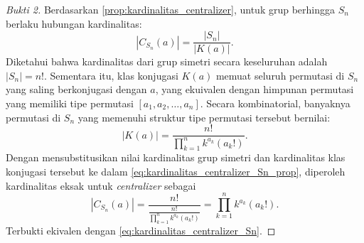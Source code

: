 \begin{proof}[Bukti 2]
  Berdasarkan \autoref{prop:kardinalitas_centralizer}, untuk grup berhingga $S_n$ berlaku hubungan kardinalitas:
  \begin{equation}\label{eq:kardinalitas_centralizer_Sn_prop}
    |C_{S_n}(a)| = \frac{|S_n|}{|K(a)|}.
  \end{equation}
  Diketahui bahwa kardinalitas dari grup simetri secara keseluruhan adalah $|S_n| = n!$. Sementara itu, klas konjugasi $K(a)$ memuat seluruh permutasi di $S_n$ yang saling berkonjugasi dengan $a$, yang ekuivalen dengan himpunan permutasi yang memiliki tipe permutasi $[a_1, a_2, \ldots, a_n]$. Secara kombinatorial, banyaknya permutasi di $S_n$ yang memenuhi struktur tipe permutasi tersebut bernilai:
  \[
    |K(a)| = \frac{n!}{\prod_{k=1}^{n} k^{a_k} (a_k!)}.
  \]
  Dengan mensubstitusikan nilai kardinalitas grup simetri dan kardinalitas klas konjugasi tersebut ke dalam \eqref{eq:kardinalitas_centralizer_Sn_prop}, diperoleh kardinalitas eksak untuk \emph{centralizer} sebagai
  \[
    |C_{S_n}(a)| = \frac{n!}{\frac{n!}{\prod_{k=1}^{n} k^{a_k} (a_k!)}} = \prod_{k=1}^{n} k^{a_k} (a_k!).
  \]
  Terbukti ekivalen dengan \eqref{eq:kardinalitas_centralizer_Sn}.
\end{proof}

